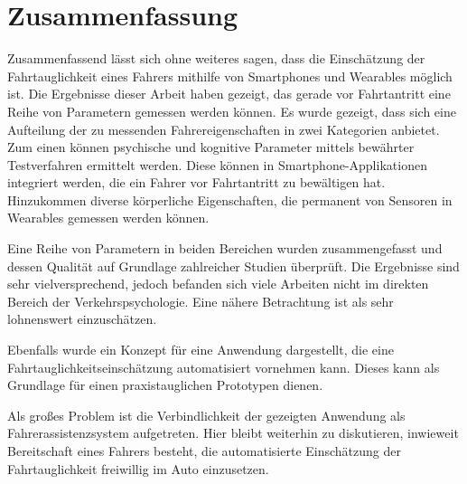\section{Zusammenfassung}
\label{conclusion}
Zusammenfassend lässt sich ohne weiteres sagen, dass die Einschätzung der Fahrtauglichkeit eines Fahrers mithilfe von Smartphones und Wearables möglich ist. Die Ergebnisse dieser Arbeit haben gezeigt, das gerade vor Fahrtantritt eine Reihe von Parametern gemessen werden können. Es wurde gezeigt, dass sich eine Aufteilung der zu messenden Fahrereigenschaften in zwei Kategorien anbietet. Zum einen können psychische und kognitive Parameter mittels bewährter Testverfahren ermittelt werden. Diese können in Smartphone-Applikationen integriert werden, die ein Fahrer vor Fahrtantritt zu bewältigen hat. Hinzukommen diverse körperliche Eigenschaften, die permanent von Sensoren in Wearables gemessen werden können.

Eine Reihe von Parametern in beiden Bereichen wurden zusammengefasst und dessen Qualität auf Grundlage zahlreicher Studien überprüft. Die Ergebnisse sind sehr vielversprechend, jedoch befanden sich viele Arbeiten nicht im direkten Bereich der Verkehrspsychologie. Eine nähere Betrachtung ist als sehr lohnenswert einzuschätzen.

Ebenfalls wurde ein Konzept für eine Anwendung dargestellt, die eine Fahrtauglichkeitseinschätzung automatisiert vornehmen kann. Dieses kann als Grundlage für einen praxistauglichen Prototypen dienen.

Als großes Problem ist die Verbindlichkeit der gezeigten Anwendung als Fahrerassistenzsystem aufgetreten. Hier bleibt weiterhin zu diskutieren, inwieweit Bereitschaft eines Fahrers besteht, die automatisierte Einschätzung der Fahrtauglichkeit freiwillig im Auto einzusetzen.